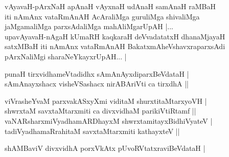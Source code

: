 \begin{entry}
\medskip
\begin{shl}
vAyavaH-pArxNaH apAnaH vAyxnaH udAnaH samAnaH raMBaH\\[2pt]
iti nAmAnx vataRmAnAH AcAraliMga guruliMga shivaliMga\\[2pt]
jaMgamaliMga parxsAdaliMga mahAliMgarUpAH |...\\[2pt]
upavAyavaH-nAgaH kUmaRH kaqkaraH deVvadatatxH dhanaMjayaH\\[2pt]
satxMBaH iti nAmAnx vataRmAnAH BakatxmAheVshavxraparxsAdi\\[2pt]
pArxNaliMgi sharaNeYkayxrUpAH... |
\end{shl}
\medskip
{}
\medskip
{}
\medskip
\begin{shl}
punaH tirxvidhameVtadidhx sAmAnAyxdiparxBeVdataH |\\[2pt]
sAmAnayxshacx visheVSashacx nirABAriVti ca tirxdhA ||\\[-1pt]
\end{shl}
\medskip
{}
\vskip 5pt
\vskip 9pt
\medskip
\begin{shl}
viVrasheYvaM parxvakASxyXmi viditaM shurxtitaMtarxyoVH |\\[2pt]
shwrxtaM savxtaMtarxmiti ca divxvidhaM parikiVtiRtamf ||\\[2pt]
vaNARsharxmiVyadhamARDhayxM shwrxtamitayxBidhiVyateV |\\[2pt]
tadiVyadhamaRrahitaM savxtaMtarxmiti kathayxteV ||\\[-1pt]
\end{shl}
\medskip
{}
\smallskip
{}
\medskip
\begin{shl}
shAMBaviV divxvidhA porxVkAtx pUvoRVtatxraviBeVdataH |\\[-1pt]
\end{shl}

\end{entry}
